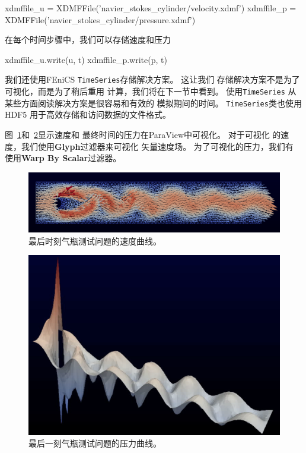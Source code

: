 \begin{python}
xdmffile_u = XDMFFile('navier_stokes_cylinder/velocity.xdmf')
xdmffile_p = XDMFFile('navier_stokes_cylinder/pressure.xdmf')
\end{python}
在每个时间步骤中，我们可以存储速度和压力
\begin{python}[language=Python,style=graycolor]
xdmffile_u.write(u, t)
xdmffile_p.write(p, t)
\end{python}


我们还使用FEniCS \texttt{TimeSeries}存储解决方案。 这让我们
存储解决方案不是为了可视化，而是为了稍后重用
计算，我们将在下一节中看到。 使用\texttt{TimeSeries}
从某些方面阅读解决方案是很容易和有效的
模拟期间的时间。 \texttt{TimeSeries}类也使用HDF5
用于高效存储和访问数据的文件格式。

图~\ref{ftut1:fig:navier_stokes_cylinder:velocity}和~\ref{ftut1:fig:navier_stokes_cylinder:pressure}显示速度和
最终时间的压力在ParaView中可视化。 对于可视化
的速度，我们使用\textbf{Glyph}过滤器来可视化
矢量速度场。 为了可视化的压力，我们有
使用\textbf{Warp By Scalar}过滤器。

\begin{figure}[!ht]  %
 \centerline{\includegraphics[width=0.95\linewidth]{fig/navier_stokes_cylinder_velocity.png}}
 \caption{
 最后时刻气瓶测试问题的速度曲线。\label{ftut1:fig:navier_stokes_cylinder:velocity}
 }
\end{figure}

\begin{figure}[!ht]  %
 \centerline{\includegraphics[width=0.95\linewidth]{fig/navier_stokes_cylinder_pressure.png}}
 \caption{
 最后一刻气瓶测试问题的压力曲线。\label{ftut1:fig:navier_stokes_cylinder:pressure}
 }
\end{figure}

